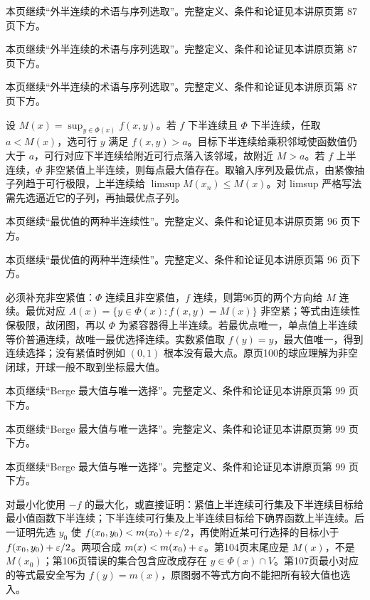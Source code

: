 本页继续“外半连续的术语与序列选取”。完整定义、条件和论证见本讲原页第 87 页下方。

本页继续“外半连续的术语与序列选取”。完整定义、条件和论证见本讲原页第 87 页下方。

本页继续“外半连续的术语与序列选取”。完整定义、条件和论证见本讲原页第 87 页下方。

设 $M(x)=\sup_{y\in\Phi(x)}f(x,y)$。若 $f$ 下半连续且 $\Phi$ 下半连续，任取 $a<M(x)$，选可行 $y$ 满足 $f(x,y)>a$。目标下半连续给乘积邻域使函数值仍大于 $a$，可行对应下半连续给附近可行点落入该邻域，故附近 $M>a$。若 $f$ 上半连续，$\Phi$ 非空紧值上半连续，则每点最大值存在。取输入序列及最优点，由紧像抽子列趋于可行极限，上半连续给 $\limsup M(x_n)\le M(x)$。对 limsup 严格写法需先选逼近它的子列，再抽最优点子列。

本页继续“最优值的两种半连续性”。完整定义、条件和论证见本讲原页第 96 页下方。

本页继续“最优值的两种半连续性”。完整定义、条件和论证见本讲原页第 96 页下方。

必须补充非空紧值：$\Phi$ 连续且非空紧值，$f$ 连续，则第96页的两个方向给 $M$ 连续。最优对应 $A(x)=\{y\in\Phi(x):f(x,y)=M(x)\}$ 非空紧；等式由连续性保极限，故闭图，再以 $\Phi$ 为紧容器得上半连续。若最优点唯一，单点值上半连续等价普通连续，故唯一最优选择连续。实数紧值取 $f(y)=y$，最大值唯一，得到连续选择；没有紧值时例如 $(0,1)$ 根本没有最大点。原页100的球应理解为非空闭球，开球一般不取到坐标最大值。

本页继续“Berge 最大值与唯一选择”。完整定义、条件和论证见本讲原页第 99 页下方。

本页继续“Berge 最大值与唯一选择”。完整定义、条件和论证见本讲原页第 99 页下方。

本页继续“Berge 最大值与唯一选择”。完整定义、条件和论证见本讲原页第 99 页下方。

对最小化使用 $-f$ 的最大化，或直接证明：紧值上半连续可行集及下半连续目标给最小值函数下半连续；下半连续可行集及上半连续目标给下确界函数上半连续。后一证明先选 $y_0$ 使 $f(x_0,y_0)<m(x_0)+\varepsilon/2$，再使附近某可行选择的目标小于 $f(x_0,y_0)+\varepsilon/2$。两项合成 $m(x)<m(x_0)+\varepsilon$。第104页末尾应是 $M(x)$，不是 $M(x_0)$；第106页错误的集合包含应改成存在 $y\in\Phi(x)\cap V$。第107页最小对应的等式最安全写为 $f(y)=m(x)$，原图弱不等式方向不能把所有较大值也选入。

